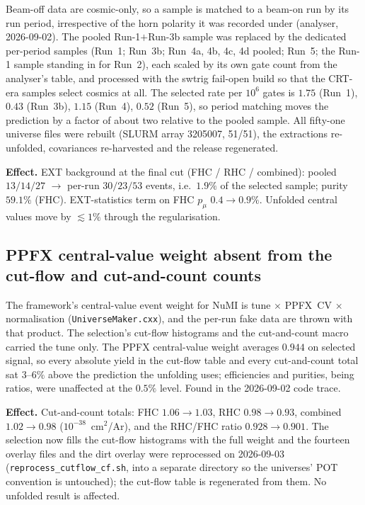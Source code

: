 Beam-off data are cosmic-only, so a sample is matched to a beam-on run by its run period,
irrespective of the horn polarity it was recorded under (analyser, 2026-09-02).  The
pooled Run-1$+$Run-3b sample was replaced by the dedicated per-period samples (Run~1;
Run~3b; Run~4a, 4b, 4c, 4d pooled; Run~5; the Run-1 sample standing in for Run~2), each
scaled by its own gate count from the analyser's table, and processed with the swtrig
fail-open build so that the CRT-era samples select cosmics at all.  The selected rate per
$10^{6}$ gates is $1.75$ (Run~1), $0.43$ (Run~3b), $1.15$ (Run~4), $0.52$ (Run~5), so
period matching moves the prediction by a factor of about two relative to the pooled
sample.  All fifty-one universe files were rebuilt (SLURM array 3205007, 51/51), the
extractions re-unfolded, covariances re-harvested and the release regenerated.

\textbf{Effect.}  EXT background at the final cut (FHC / RHC / combined): pooled
$13/14/27$ $\to$ per-run $30/23/53$ events, i.e.\ $1.9\%$ of the selected sample; purity
$59.1\%$ (FHC).  EXT-statistics term on FHC $p_\mu$ $0.4\to0.9\%$.  Unfolded central
values move by $\lesssim1\%$ through the regularisation.

\subsection{PPFX central-value weight absent from the cut-flow and cut-and-count counts}

The framework's central-value event weight for NuMI is tune $\times$ PPFX~CV $\times$
normalisation (\texttt{UniverseMaker.cxx}), and the per-run fake data are thrown with
that product.  The selection's cut-flow histograms and the cut-and-count macro carried
the tune only.  The PPFX central-value weight averages $0.944$ on selected signal, so
every absolute yield in the cut-flow table and every cut-and-count total sat $3$--$6\%$
above the prediction the unfolding uses; efficiencies and purities, being ratios, were
unaffected at the $0.5\%$ level.  Found in the 2026-09-02 code trace.

\textbf{Effect.}  Cut-and-count totals: FHC $1.06\to1.03$, RHC $0.98\to0.93$, combined
$1.02\to0.98$ ($10^{-38}$~cm$^2$/Ar), and the RHC/FHC ratio $0.928\to0.901$.  The
selection now fills the cut-flow histograms with the full weight and the fourteen
overlay files and the dirt overlay were reprocessed on 2026-09-03
(\texttt{reprocess\_cutflow\_cf.sh}, into a separate directory so the universes' POT
convention is untouched); the cut-flow table is regenerated from them.  No unfolded
result is affected.

